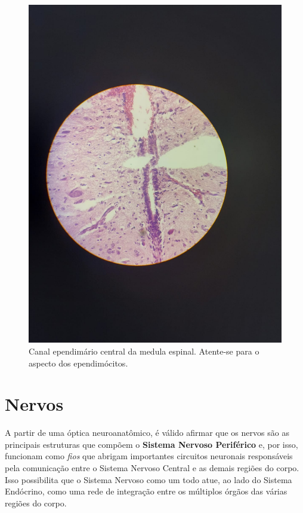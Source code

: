 \documentclass[
]{book}
\begin{document}
\begin{figure}
\centering
\includegraphics{images/neuro-ependima.jpeg}
\caption{\label{fig:unnamed-chunk-8}Canal ependimário central da medula espinal. Atente-se para o aspecto dos ependimócitos.}
\end{figure}

\hypertarget{nervos}{%
\chapter{Nervos}\label{nervos}}

A partir de uma óptica neuroanatômico, é válido afirmar que os nervos são as principais estruturas que compõem o \textbf{Sistema Nervoso Periférico} e, por isso, funcionam como \emph{fios} que abrigam importantes circuitos neuronais responsáveis pela comunicação entre o Sistema Nervoso Central e as demais regiões do corpo. Isso possibilita que o Sistema Nervoso como um todo atue, ao lado do Sistema Endócrino, como uma rede de integração entre os múltiplos órgãos das várias regiões do corpo.
\end{document}
